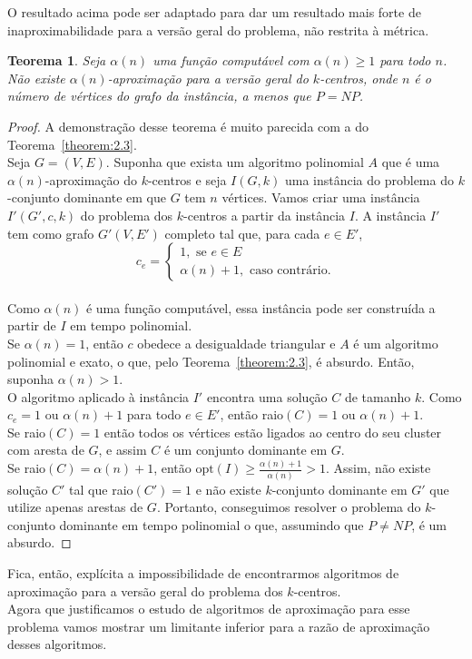 \documentclass[12pt]{article}
\newcommand{\opt}{\ensuremath{\mathrm{opt}}}
\newtheorem{theorem}{Teorema}[section]
\newcommand{\NP}{\mathit{NP}}
\begin{document}
O resultado acima pode ser adaptado para dar um resultado mais forte de inaproximabilidade para a versão geral do problema, não restrita à métrica.
\begin{theorem}
    Seja $\alpha(n)$ uma função computável com $\alpha(n)\geq 1$ para todo $n$. Não existe $\alpha(n)$-aproximação para a versão geral do $k$-centros, onde $n$ é o número de vértices do grafo da instância, a menos que $P=\NP$.
\end{theorem}

\begin{proof}
        A demonstração desse teorema é muito parecida com a do Teorema~\ref{theorem:2.3}. \\
        Seja $G = (V,E)$. Suponha que exista um algoritmo polinomial $A$ que é uma $\alpha(n)$-aproximação do $k$-centros e seja $I(G,k)$ uma instância do problema do $k$-conjunto dominante em que $G$ tem $n$ vértices. Vamos criar uma instância $I'(G',c,k)$ do problema dos $k$-centros a partir da instância $I$. A instância $I'$ tem como grafo $G'(V,E')$ completo tal que, para cada $e \in E'$, \\
    \[c_e = \begin{cases}
            1, \text{ se } e \in E \\
            \alpha(n)+1, \text{ caso contrário.} 
            \end{cases}\]\\
    Como $\alpha(n)$ é uma função computável, essa instância pode ser construída a partir de $I$ em tempo polinomial. \\
    Se $\alpha(n)=1$, então $c$ obedece a desigualdade triangular e $A$ é um algoritmo polinomial e exato, o que, pelo Teorema~\ref{theorem:2.3}, é absurdo. Então, suponha $\alpha(n)>1$. \\
    O algoritmo aplicado à instância $I'$ encontra uma solução $C$ de tamanho $k$. Como $c_e = 1$ ou $\alpha(n)+1$ para todo $e \in E'$, então raio$(C)=1$ ou $\alpha(n)+1$.\\
    Se raio$(C)=1$ então todos os vértices estão ligados ao centro do seu cluster com aresta de $G$, e assim $C$ é um conjunto dominante em $G$. \\
    Se raio$(C) = \alpha(n) + 1$, então $\opt(I) \geq \frac{\alpha(n)+1}{\alpha(n)}>1$. Assim, não existe solução $C'$ tal que raio$(C')=1$ e não existe $k$-conjunto dominante em $G'$ que utilize apenas arestas de $G$.
    Portanto, conseguimos resolver o problema do $k$-conjunto dominante em tempo polinomial o que, assumindo que $P \neq \NP$, é um absurdo.
\end{proof}
    Fica, então, explícita a impossibilidade de encontrarmos algoritmos de aproximação para a versão geral do problema dos $k$-centros.\\
    Agora que justificamos o estudo de algoritmos de aproximação para esse problema vamos mostrar um limitante inferior para a razão de aproximação desses algoritmos.
    
\end{document}
